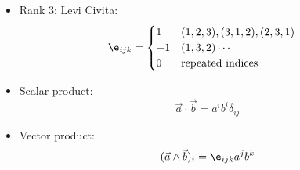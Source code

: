 \documentclass[cplx.tex]{subfiles}
\begin{document}
\begin{itemize}
    \item Rank 3: Levi Civita:
        \begin{align}
            \e_{ijk} &= \begin{cases} 1 & (1,2,3),(3,1,2),(2,3,1) \\ -1 & (1,3,2)\cdots \\ 0 & \text{repeated indices} \end{cases}
        \end{align}
    \item Scalar product:
        \begin{equation}
            \vec{a}\cdot\vec{b} = a^ib^i\delta_{ij} 
        \end{equation}
    \item Vector product:
    \begin{equation}
        (\vec{a}\land \vec{b})_i = \e_{ijk}a^jb^k
    \end{equation}
\end{itemize}
\end{document}
